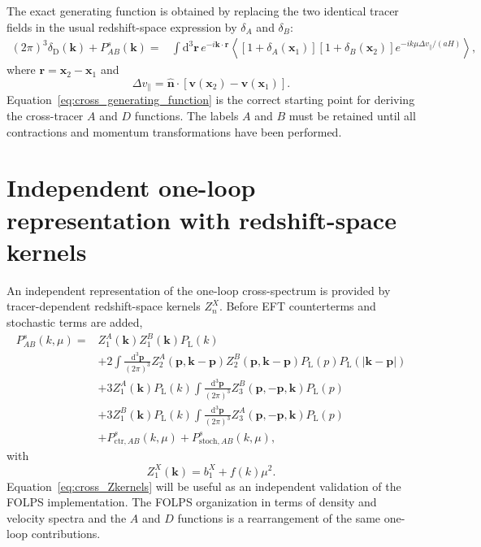\documentclass[11pt,a4paper]{article}
\newcommand{\bs}[1]{\boldsymbol{#1}}
\newcommand{\dd}{\mathrm{d}}
\newcommand{\PL}{P_{\mathrm{L}}}
\newcommand{\PD}{\delta_{\mathrm{D}}}
\newcommand{\intp}{\int\!\frac{\dd^3\bs{p}}{(2\pi)^3}}
\begin{document}
The exact generating function is obtained by replacing the two identical tracer fields in the usual redshift-space expression by $\delta_A$ and $\delta_B$:
\begin{equation}
\begin{split}
    (2\pi)^3\PD(\bs{k})+P_{AB}^s(\bs{k})
    ={}&
    \int \dd^3\bs{r}\,
    e^{-i\bs{k}\cdot\bs{r}}
    \left\langle
        \left[1+\delta_A(\bs{x}_1)\right]
        \left[1+\delta_B(\bs{x}_2)\right]
        e^{-ik\mu\Delta v_{\parallel}/(aH)}
    \right\rangle,
\end{split}
\label{eq:cross_generating_function}
\end{equation}
where $\bs{r}=\bs{x}_2-\bs{x}_1$ and
\begin{equation}
    \Delta v_{\parallel}
    =
    \hat{\bs{n}}\cdot
    \left[\bs{v}(\bs{x}_2)-\bs{v}(\bs{x}_1)\right].
\end{equation}
Equation~\eqref{eq:cross_generating_function} is the correct starting point for deriving the cross-tracer $A$ and $D$ functions. The labels $A$ and $B$ must be retained until all contractions and momentum transformations have been performed.

\section{Independent one-loop representation with redshift-space kernels}
\label{sec:Zn}

An independent representation of the one-loop cross-spectrum is provided by tracer-dependent redshift-space kernels $Z_n^X$. Before EFT counterterms and stochastic terms are added,
\begin{align}
    P_{AB}^s(k,\mu)
    ={}&
    Z_1^A(\bs{k})Z_1^B(\bs{k})\PL(k)
    \nonumber\\
    &+2\intp
    Z_2^A(\bs{p},\bs{k}-\bs{p})
    Z_2^B(\bs{p},\bs{k}-\bs{p})
    \PL(p)\PL(|\bs{k}-\bs{p}|)
    \nonumber\\
    &+3Z_1^A(\bs{k})\PL(k)
    \intp
    Z_3^B(\bs{p},-\bs{p},\bs{k})\PL(p)
    \nonumber\\
    &+3Z_1^B(\bs{k})\PL(k)
    \intp
    Z_3^A(\bs{p},-\bs{p},\bs{k})\PL(p)
    \nonumber\\
    &+P_{\mathrm{ctr},AB}^s(k,\mu)
    +P_{\mathrm{stoch},AB}^s(k,\mu),
\label{eq:cross_Zkernels}
\end{align}
with
\begin{equation}
    Z_1^X(\bs{k})=b_1^X+f(k)\mu^2.
\end{equation}
Equation~\eqref{eq:cross_Zkernels} will be useful as an independent validation of the FOLPS implementation. The FOLPS organization in terms of density and velocity spectra and the $A$ and $D$ functions is a rearrangement of the same one-loop contributions.
\end{document}
